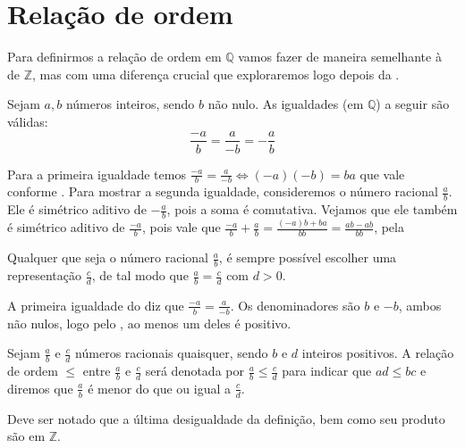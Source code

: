 \documentclass[../main.tex]{subfiles}
\begin{document}
\section{Relação de ordem}
Para definirmos a relação de ordem em $\mathbb{Q}$ vamos fazer de maneira semelhante à de $\mathbb{Z}$, mas com uma diferença crucial que exploraremos logo depois da .
\begin{teo}\label{rac-teo-fracSinais}
    Sejam $a,b$ números inteiros, sendo $b$ não nulo. As igualdades (em $\mathbb{Q}$) a seguir são válidas:
    \[ \frac{-a}{b} = \frac{a}{-b} = -\frac{a}{b} \]
\end{teo}
\begin{dem}
    Para a primeira igualdade temos $\frac{-a}{b} = \frac{a}{-b} \iff (-a)(-b) = ba$ que vale conforme . Para mostrar a segunda igualdade, consideremos o número racional $\frac{a}{b}$. Ele é simétrico aditivo de $-\frac{a}{b}$, pois a soma é comutativa. Vejamos que ele também é simétrico aditivo de $\frac{-a}{b}$, pois vale que $\frac{-a}{b} + \frac{a}{b} = \frac{(-a)b + ba}{bb} = \frac{ab - ab}{bb}$, pela 
\end{dem}
\begin{corol}\label{rac-corol-escolhaDenominador}
    Qualquer que seja o número racional $\frac{a}{b}$, é sempre possível escolher uma representação $\frac{c}{d}$, de tal modo que $\frac{a}{b} = \frac{c}{d}$ com $d > 0$.
\end{corol}
\begin{dem}
    A primeira igualdade do  diz que $\frac{-a}{b} = \frac{a}{-b}$. Os denominadores são $b$ e $-b$, ambos não nulos, logo pelo , ao menos um deles é positivo.
\end{dem}

\begin{defi}\label{rac-def-relOrdem}
    Sejam $\frac{a}{b}$ e $\frac{c}{d}$ números racionais quaisquer, sendo $b$ e $d$ inteiros positivos. A relação de ordem $\leq$ entre $\frac{a}{b}$ e $\frac{c}{d}$ será denotada por $\frac{a}{b} \leq \frac{c}{d}$ para indicar que $ad \leq bc$ e diremos que $\frac{a}{b}$ é menor do que ou igual a $\frac{c}{d}$. 
\end{defi}
\begin{obs}
    Deve ser notado que a última desigualdade da definição, bem como seu produto são em $\mathbb{Z}$.
\end{obs}
\end{document}
